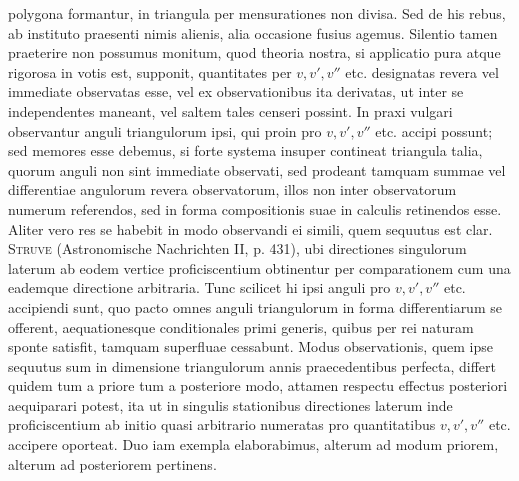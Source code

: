 polygona formantur, in triangula per mensurationes non divisa. Sed de his rebus, ab instituto praesenti nimis alienis, alia occasione fusius agemus. Silentio tamen praeterire non possumus monitum, quod theoria nostra, si applicatio pura atque rigorosa in votis est, supponit, quantitates per \(v,v',v''\) etc. designatas revera vel immediate observatas esse, vel ex observationibus ita derivatas, ut inter se independentes maneant, vel saltem tales censeri possint. In praxi vulgari observantur anguli triangulorum ipsi, qui proin pro \(v,v',v''\) etc. accipi possunt; sed memores esse debemus, si forte systema insuper contineat triangula talia, quorum anguli non sint immediate observati, sed prodeant tamquam summae vel differentiae angulorum revera observatorum, illos non inter observatorum numerum referendos, sed in forma compositionis suae in calculis retinendos esse. Aliter vero res se habebit in modo observandi ei simili, quem sequutus est clar. \textsc{Struve} (Astronomische Nachrichten II, p. 431), ubi directiones singulorum laterum ab eodem vertice proficiscentium obtinentur per comparationem cum una eademque directione arbitraria. Tunc scilicet hi ipsi anguli pro \(v,v',v''\) etc. accipiendi sunt, quo pacto omnes anguli triangulorum in forma differentiarum se offerent, aequationesque conditionales primi generis, quibus per rei naturam sponte satisfit, tamquam superfluae cessabunt. Modus observationis, quem ipse sequutus sum in dimensione triangulorum annis praecedentibus perfecta, differt quidem tum a priore tum a posteriore modo, attamen respectu effectus posteriori aequiparari potest, ita ut in singulis stationibus directiones laterum inde proficiscentium ab initio quasi arbitrario numeratas pro quantitatibus \(v,v',v''\) etc. accipere oporteat. Duo iam exempla elaborabimus, alterum ad modum priorem, alterum ad posteriorem pertinens.

